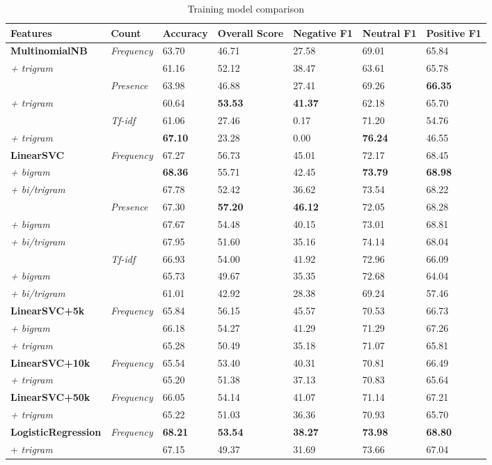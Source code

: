 \begin{table}[h]
\caption{Training model comparison}
\begin{tabular}{@{}lllllll@{}}
\toprule
\textbf{Features} & \textbf{Count} & \textbf{Accuracy} & \textbf{Overall Score} & \textbf{Negative F1} & \textbf{Neutral F1} & \textbf{Positive F1} \\
\toprule
\textbf{MultinomialNB} & \textit{Frequency} & 63.70 & 46.71 & 27.58 & 69.01 & 65.84 \\
\textit{+ trigram} & \textit{} & 61.16 & 52.12 & 38.47 & 63.61 & 65.78 \\
 & \textit{Presence} & 63.98 & 46.88 & 27.41 & 69.26 & \textbf{66.35} \\
\textit{+ trigram} & \textit{} & 60.64 & \textbf{53.53} & \textbf{41.37} & 62.18 & 65.70 \\
 & \textit{Tf-idf} & 61.06 & 27.46 & 0.17 & 71.20 & 54.76 \\
\textit{+ trigram} & \textit{} & \textbf{67.10} & 23.28 & 0.00 & \textbf{76.24} & 46.55 \\
\toprule
\textbf{LinearSVC} & \textit{Frequency} & 67.27 & 56.73 & 45.01 & 72.17 & 68.45 \\
\textit{+ bigram} & \textit{} & \textbf{68.36} & 55.71 & 42.45 & \textbf{73.79} & \textbf{68.98} \\
\textit{+ bi/trigram} & \textit{} & 67.78 & 52.42 & 36.62 & 73.54 & 68.22 \\
 & \textit{Presence} & 67.30 & \textbf{57.20} & \textbf{46.12} & 72.05 & 68.28 \\
\textit{+ bigram} & \textit{} & 67.67 & 54.48 & 40.15 & 73.01 & 68.81 \\
\textit{+ bi/trigram} & \textit{} & 67.95 & 51.60 & 35.16 & 74.14 & 68.04 \\
 & \textit{Tf-idf} & 66.93 & 54.00 & 41.92 & 72.96 & 66.09 \\
\textit{+ bigram} & \textit{} & 65.73 & 49.67 & 35.35 & 72.68 & 64.04 \\
\textit{+ bi/trigram} & \textit{} & 61.01 & 42.92 & 28.38 & 69.24 & 57.46 \\
\textbf{LinearSVC+5k} & \textit{Frequency} & 65.84 & 56.15 & 45.57 & 70.53 & 66.73 \\
\textit{+ bigram} &  & 66.18 & 54.27 & 41.29 & 71.29 & 67.26 \\
\textit{+ trigram} &  & 65.28 & 50.49 & 35.18 & 71.07 & 65.81 \\
\textbf{LinearSVC+10k} & \textit{Frequency} & 65.54 & 53.40 & 40.31 & 70.81 & 66.49 \\
\textit{+ trigram} &  & 65.20 & 51.38 & 37.13 & 70.83 & 65.64 \\
\textbf{LinearSVC+50k} & \textit{Frequency} & 66.05 & 54.14 & 41.07 & 71.14 & 67.21 \\
\textit{+ trigram} &  & 65.22 & 51.03 & 36.36 & 70.93 & 65.70 \\
\toprule
\textbf{LogisticRegression} & \textit{Frequency} & \textbf{68.21} & \textbf{53.54} & \textbf{38.27} & \textbf{73.98} & \textbf{68.80} \\
+ \textit{trigram} &  & 67.15 & 49.37 & 31.69 & 73.66 & 67.04 \\
\bottomrule
\end{tabular}
\label{table:train}
\end{table}